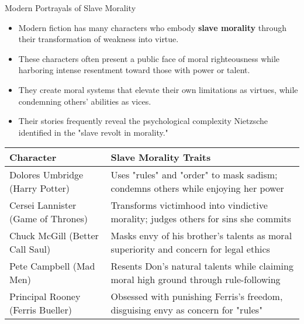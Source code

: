 \documentclass{beamer}
\begin{document}
\begin{frame}{Modern Portrayals of Slave Morality}
    \begin{itemize}
    \item Modern fiction has many characters who embody \textbf{slave morality} through their transformation of weakness into virtue.
    \item These characters often present a public face of moral righteousness while harboring intense resentment toward those with power or talent.
    \item They create moral systems that elevate their own limitations as virtues, while condemning others' abilities as vices.
    \item Their stories frequently reveal the psychological complexity Nietzsche identified in the "slave revolt in morality."
    \end{itemize}
    
    \begin{center}
        \scriptsize
    \begin{tabular}{|p{3cm}|p{7cm}|}
    \hline
    \textbf{Character} & \textbf{Slave Morality Traits} \\
    \hline
    Dolores Umbridge (Harry Potter) & Uses "rules" and "order" to mask sadism; condemns others while enjoying her power \\
    \hline
    Cersei Lannister (Game of Thrones) & Transforms victimhood into vindictive morality; judges others for sins she commits \\
    \hline
    Chuck McGill (Better Call Saul) & Masks envy of his brother's talents as moral superiority and concern for legal ethics \\
    \hline
    Pete Campbell (Mad Men) & Resents Don's natural talents while claiming moral high ground through rule-following \\
    \hline
    Principal Rooney (Ferris Bueller) & Obsessed with punishing Ferris's freedom, disguising envy as concern for "rules" \\
    \hline
    \end{tabular}
    \end{center}
    \end{frame}
\end{document}
